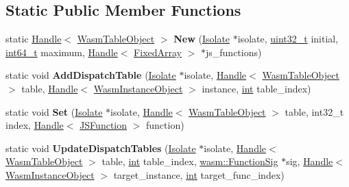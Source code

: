 \subsection*{Static Public Member Functions}
\begin{DoxyCompactItemize}
\item 
\mbox{\label{classv8_1_1internal_1_1WasmTableObject_a58747b0a090a94d254e0b742c7d9d83f}} 
static \mbox{\hyperlink{classv8_1_1internal_1_1Handle}{Handle}}$<$ \mbox{\hyperlink{classv8_1_1internal_1_1WasmTableObject}{Wasm\+Table\+Object}} $>$ {\bfseries New} (\mbox{\hyperlink{classv8_1_1internal_1_1Isolate}{Isolate}} $\ast$isolate, \mbox{\hyperlink{classuint32__t}{uint32\+\_\+t}} initial, \mbox{\hyperlink{classint64__t}{int64\+\_\+t}} maximum, \mbox{\hyperlink{classv8_1_1internal_1_1Handle}{Handle}}$<$ \mbox{\hyperlink{classv8_1_1internal_1_1FixedArray}{Fixed\+Array}} $>$ $\ast$js\+\_\+functions)
\item 
\mbox{\label{classv8_1_1internal_1_1WasmTableObject_a85d23a412078580cc7163127e8115e72}} 
static void {\bfseries Add\+Dispatch\+Table} (\mbox{\hyperlink{classv8_1_1internal_1_1Isolate}{Isolate}} $\ast$isolate, \mbox{\hyperlink{classv8_1_1internal_1_1Handle}{Handle}}$<$ \mbox{\hyperlink{classv8_1_1internal_1_1WasmTableObject}{Wasm\+Table\+Object}} $>$ table, \mbox{\hyperlink{classv8_1_1internal_1_1Handle}{Handle}}$<$ \mbox{\hyperlink{classv8_1_1internal_1_1WasmInstanceObject}{Wasm\+Instance\+Object}} $>$ instance, \mbox{\hyperlink{classint}{int}} table\+\_\+index)
\item 
\mbox{\label{classv8_1_1internal_1_1WasmTableObject_aff98252569d9c473fce4f42be46bd989}} 
static void {\bfseries Set} (\mbox{\hyperlink{classv8_1_1internal_1_1Isolate}{Isolate}} $\ast$isolate, \mbox{\hyperlink{classv8_1_1internal_1_1Handle}{Handle}}$<$ \mbox{\hyperlink{classv8_1_1internal_1_1WasmTableObject}{Wasm\+Table\+Object}} $>$ table, int32\+\_\+t index, \mbox{\hyperlink{classv8_1_1internal_1_1Handle}{Handle}}$<$ \mbox{\hyperlink{classv8_1_1internal_1_1JSFunction}{J\+S\+Function}} $>$ function)
\item 
\mbox{\label{classv8_1_1internal_1_1WasmTableObject_a003fdf1e3bcad5d9e33908cbc728bfee}} 
static void {\bfseries Update\+Dispatch\+Tables} (\mbox{\hyperlink{classv8_1_1internal_1_1Isolate}{Isolate}} $\ast$isolate, \mbox{\hyperlink{classv8_1_1internal_1_1Handle}{Handle}}$<$ \mbox{\hyperlink{classv8_1_1internal_1_1WasmTableObject}{Wasm\+Table\+Object}} $>$ table, \mbox{\hyperlink{classint}{int}} table\+\_\+index, \mbox{\hyperlink{classv8_1_1internal_1_1Signature}{wasm\+::\+Function\+Sig}} $\ast$sig, \mbox{\hyperlink{classv8_1_1internal_1_1Handle}{Handle}}$<$ \mbox{\hyperlink{classv8_1_1internal_1_1WasmInstanceObject}{Wasm\+Instance\+Object}} $>$ target\+\_\+instance, \mbox{\hyperlink{classint}{int}} target\+\_\+func\+\_\+index)

\end{DoxyCompactItemize}
